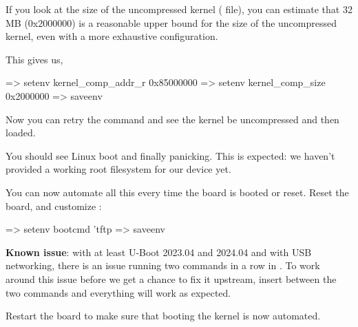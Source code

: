 If you look at the size of the uncompressed kernel ( file),
you can estimate that 32 MB (0x2000000) is a reasonable upper bound
for the size of the uncompressed kernel, even with a more exhaustive
configuration.

This gives us,

\begin{ubootinput}
=> setenv kernel_comp_addr_r 0x85000000
=> setenv kernel_comp_size 0x2000000
=> saveenv
\end{ubootinput}

Now you can retry the  command and see the kernel be uncompressed
and then loaded.
\fi

You should see Linux boot and finally panicking. This is expected: we
haven't provided a working root filesystem for our device yet.

You can now automate all this every time the board is booted or
reset. Reset the board, and customize :

\begin{ubootinput}
=> setenv bootcmd 'tftp %
=> saveenv
\end{ubootinput}

{{\bf Known issue}: with at least U-Boot 2023.04 and 2024.04 and with
USB networking, there is an issue running two  commands in a
row in . To work around this issue before we get a chance
to fix it upstream, insert  between the two 
commands and everything will work as expected.}{}

Restart the board to make sure that booting the kernel is now automated.
